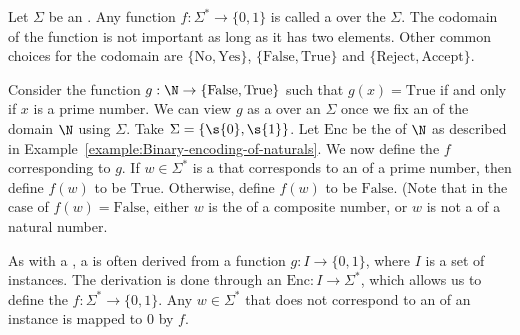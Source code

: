 \begin{flex}
\begin{definition} \label{definition:Decision-problem}
Let $\Sigma$ be an . Any function $f: \Sigma^* \to \{0,1\}$ is called a  over the  $\Sigma$. 
The codomain of the function is not important as long as it has two elements. 
Other common choices for the codomain are $\{\text{No}, \text{Yes}\}$, $\{\text{False}, \text{True}\}$ and $\{ \text{Reject}, \text{Accept}\}$.
\end{definition}

\begin{example} \label{example:Primality-testing-as-a-decision-problem}
Consider the function $g:\N \to \{\text{False}, \text{True}\}$ such that $g(x) = \text{True}$ if and only if $x$ is a prime number.
We can view $g$ as a  over an  $\Sigma$ once we fix an  of the domain $\N$ using $\Sigma$. 
Take $\Sigma = \{\s{0},\s{1}\}$. 
Let $\text{Enc}$ be the  of $\N$ as described in Example~\ref{example:Binary-encoding-of-naturals}. 
We now define the  $f$ corresponding to $g$. 
If $w \in \Sigma^*$ is a  that corresponds to an  of a prime number, then define $f(w)$ to be $\text{True}$. Otherwise, define $f(w)$ to be $\text{False}$. (Note that in the case of $f(w) = \text{False}$, either $w$ is the  of a composite number, or $w$ is not a  of a natural number.
\end{example}
\end{flex}


\begin{note} \label{note:Decision-problem-as-mapping-instances-to-0-or-1s}
As with a , a  is often derived from a function $g: I \to \{0,1\}$, where $I$ is a set of instances. 
The derivation is done through an  $\text{Enc}: I \to \Sigma^*$, which allows us to define the  $f: \Sigma^* \to \{0,1\}$. Any  $w \in \Sigma^*$ that does not correspond to an  of an instance is mapped to $0$ by $f$.
\end{note}

